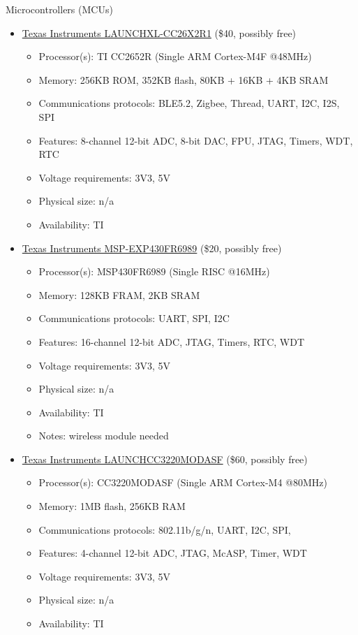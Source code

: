 \begin{flushleft}
    Microcontrollers (MCUs)
    \begin{itemize}
        \item
        \href{https://www.ti.com/tool/LAUNCHXL-CC26X2R1}{Texas Instruments LAUNCHXL-CC26X2R1} (\$40,
        possibly free)
        \begin{itemize}
            \item Processor(s): TI CC2652R (Single ARM Cortex-M4F @48MHz)
            \item Memory: 256KB ROM, 352KB flash, 80KB + 16KB + 4KB SRAM
            \item Communications protocols: BLE5.2, Zigbee, Thread, UART, I2C, I2S, SPI
            \item Features: 8-channel 12-bit ADC, 8-bit DAC, FPU, JTAG, Timers, WDT, RTC
            \item Voltage requirements: 3V3, 5V
            \item Physical size: n/a
            \item Availability: TI
        \end{itemize}

        \item
        \href{https://www.ti.com/tool/MSP-EXP430FR6989}{Texas Instruments MSP-EXP430FR6989}
        (\$20, possibly free)
        \begin{itemize}
            \item Processor(s): MSP430FR6989 (Single RISC @16MHz)
            \item Memory: 128KB FRAM, 2KB SRAM
            \item Communications protocols: UART, SPI, I2C
            \item Features: 16-channel 12-bit ADC, JTAG, Timers, RTC, WDT
            \item Voltage requirements: 3V3, 5V
            \item Physical size: n/a
            \item Availability: TI
            \item Notes: wireless module needed
        \end{itemize}

        \item
        \href{https://www.ti.com/tool/LAUNCHCC3220MODASF}{Texas Instruments LAUNCHCC3220MODASF} (\$60,
        possibly free)
        \begin{itemize}
            \item Processor(s): CC3220MODASF (Single ARM Cortex-M4 @80MHz)
            \item Memory: 1MB flash, 256KB RAM
            \item Communications protocols: 802.11b/g/n, UART, I2C, SPI,
            \item Features: 4-channel 12-bit ADC, JTAG, McASP, Timer, WDT
            \item Voltage requirements: 3V3, 5V
            \item Physical size: n/a
            \item Availability: TI
        \end{itemize}


\end{itemize}
\end{flushleft}
